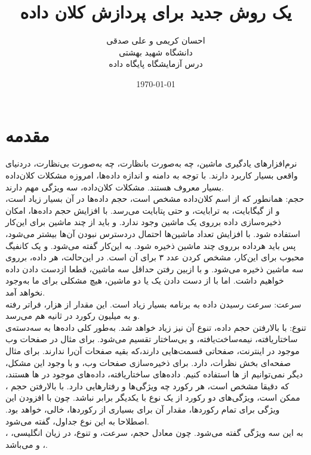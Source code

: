 \documentclass[12pt,onecolumn,a4paper]{article}
\begin{document}
\title{یک روش جدید برای پردازش کلان داده}
\author{احسان کریمی و علی صدقی \\
دانشگاه شهید بهشتی \\ درس آزمایشگاه پایگاه داده}
\date{\today}
\maketitle

\section{مقدمه}
نرم‌افزارهای یادگیری ماشین، چه به‌صورت بانظارت، چه به‌صورت بی‌نظارت، دردنیای واقعی بسیار کاربرد دارند. با توجه به دامنه و اندازه داده‌ها، امروزه مشکلات کلان‌داده بسیار معروف هستند.
مشکلات کلان‌داده، سه ویژگی مهم دارند. \\
حجم: همانطور که از اسم کلان‌داده مشخص است، حجم داده‌ها در آن بسیار زیاد است، و از گیگابایت، به ترابایت، و حتی پتابایت می‌رسد. با افزایش حجم داده‌ها، امکان ذخیره‌سازی داده برروی یک ماشین وجود ندارد.
و باید از چند ماشین برای این‌کار استفاده شود. با افزایش تعداد ماشین‌ها احتمال دردسترس نبودن آن‌ها بیشتر می‌شود، پس باید هرداده برروی چند ماشین ذخیره شود. به این‌کار  گفته می‌شود.
و یک کانفیگ محبوب برای این‌کار، مشخص کردن عدد ۳ برای آن است. در این‌حالت، هر داده، برروی سه ماشین ذخیره می‌شود. و با ازبین رفتن حداقل سه ماشین، قطعا ازدست دادن داده خواهیم داشت.
اما با از دست دادن یک یا دو ماشین، هیچ مشکلی برای ما به‌وجود نخواهد آمد. \\
سرعت: سرعت رسیدن داده به برنامه بسیار زیاد است. این مقدار از هزار، فراتر رفته و به میلیون رکورد در ثانیه هم می‌رسد. \\
تنوع: با بالارفتن حجم داده، تنوع آن نیز زیاد خواهد شد. به‌طور کلی داده‌ها به سه‌دسته‌ی ساختاریافته، نیمه‌ساخت‌یافته، و بی‌ساختار تقسیم می‌شود.
برای مثال در صفحات وب موجود در اینترنت، صفحاتی قسمت‌هایی دارند،‌که بقیه صفحات آن‌را ندارند. برای مثال صفحه‌ای بخش نظرات، دارد. برای ذخیره‌سازی صفحات وب، و با وجود این مشکل، دیگر نمی‌توانیم از ها استفاده کنیم.
داده‌های ساختاریافته، داده‌های موجود در ها هستند، که دقیقا مشخص است، هر رکورد چه ویژگی‌ها و رفتارهایی دارد. با بالارفتن حجم ، ممکن است، ویژگی‌های دو رکورد از یک نوع با یکدیگر برابر نباشد.
چون با افزودن این ویژگی برای تمام رکوردها، مقدار آن برای بسیاری از رکوردها، خالی، خواهد بود. اصطلاحا به این نوع جداول،  گفته می‌شود. \\
به این سه ویژگی  گفته می‌شود. چون معادل حجم، سرعت، و تنوع، در زیان انگلیسی، ، ، و  می‌باشد.\\
\end{document}
